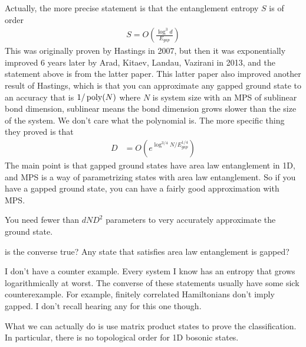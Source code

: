 Actually, the more precise statement is that the entanglement entropy $S$ is of
order
\begin{align}
    S = O\left( 
    \frac{\log^3 d}{E_{gap}}
    \right)
\end{align}
This was originally proven by Hastings in 2007,
but then it was exponentially improved 6 years later by
Arad, Kitaev, Landau, Vazirani in 2013,
and the statement above is from the latter paper.
This latter paper also improved another result of Hastings,
which is that you can approximate any gapped ground state to an accuracy that is
$1/\operatorname{poly}(N)$ where $N$ is system size with an MPS of sublinear bond dimension,
sublinear means the bond dimension grows slower than the size of the system.
We don't care what the polynomial is.
The more specific thing they proved is that
\begin{align}
    D &=
    O\left( 
    e^{\log^{3/4} N / E_{gap}^{1/4}}
    \right)
\end{align}
The main point is that gapped ground states have area law entanglement in 1D,
and MPS is a way of parametrizing states with area law entanglement.
So if you have a gapped ground state,
you can have a fairly good approximation with MPS.

You need fewer than $dND^2$ parameters to very accurately approximate the ground
state.

\begin{question}
    is the converse true?
    Any state that satisfies area law entanglement is gapped?
\end{question}
I don't have a counter example.
Every system I know has an entropy that grows logarithmically at worst.
The converse of these statements usually have some sick counterexample.
For example,
finitely correlated Hamiltonians don't imply gapped.
I don't recall hearing any for this one though.

What we can actually do is use matrix product states to prove the
classification.
In particular, there is no topological order for 1D bosonic states.
